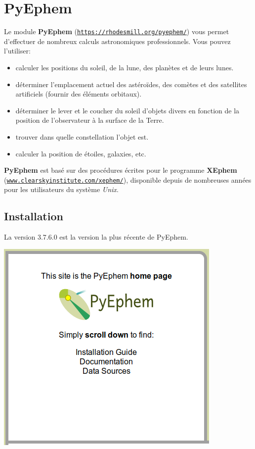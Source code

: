 \documentclass[%
oneside,                 %
final,                   %
10pt]{article}
\begin{document}
\section{PyEphem}
Le module \textbf{PyEphem} (\href{{https://rhodesmill.org/pyephem/}}{\nolinkurl{https://rhodesmill.org/pyephem/}}) vous permet d'effectuer de nombreux calculs astronomiques professionnels. Vous pouvez l'utiliser:
\begin{itemize}
\item calculer les positions du soleil, de la lune, des planètes et de leurs lunes.

\item déterminer l'emplacement actuel des astéroïdes, des comètes et des satellites artificiels (fournir des éléments orbitaux).

\item déterminer le lever et le coucher du soleil d'objets divers en fonction de la position de l'observateur à la surface de la Terre.

\item trouver dans quelle constellation l'objet est.

\item calculer la position de étoiles, galaxies, etc.
\end{itemize}

\noindent
\textbf{PyEphem} est basé sur des procédures écrites pour le programme \textbf{XEphem} (\href{{www.clearskyinstitute.com/xephem/}}{\nolinkurl{www.clearskyinstitute.com/xephem/}}), disponible depuis de nombreuses années pour les utilisateurs du système \emph{Unix}.

\subsection{Installation}
La version 3.7.6.0 est la version la plus récente de PyEphem.


\vspace{6mm}

\centerline{\includegraphics[width=0.3\linewidth]{figs/pyephem.png}}
\end{document}
